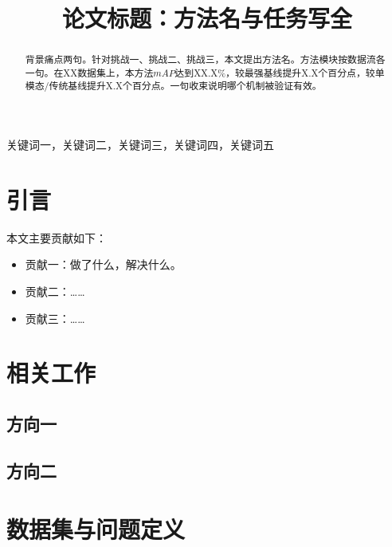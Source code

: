 \documentclass[conference]{IEEEtran}
\begin{document}
\title{论文标题：方法名与任务写全}

\author{
}

\maketitle

\begin{abstract}
背景痛点两句。针对挑战一、挑战二、挑战三，本文提出方法名。方法模块按数据流各一句。在XX数据集上，本方法$mAP$达到XX.X\%，较最强基线提升X.X个百分点，较单模态/传统基线提升X.X个百分点。一句收束说明哪个机制被验证有效。
\end{abstract}

\begin{IEEEkeywords}
关键词一，关键词二，关键词三，关键词四，关键词五
\end{IEEEkeywords}

\section{引言}
本文主要贡献如下：
\begin{itemize}
    \item 贡献一：做了什么，解决什么。
    \item 贡献二：……
    \item 贡献三：……
\end{itemize}

\section{相关工作}
\subsection{方向一}
\subsection{方向二}

\section{数据集与问题定义}
\end{document}
